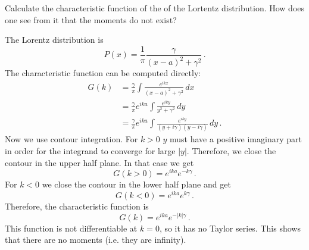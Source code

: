 

Calculate the characteristic function of the of the Lortentz distribution.
How does one see from it that the moments do not exist?


The Lorentz distribution is
\begin{equation*}
  P(x) = \frac{1}{\pi} \frac{\gamma}{(x - a)^2 + \gamma^2}
  \, .
\end{equation*}
The characteristic function can be computed directly:
\begin{align*}
  G(k)
  &= \frac{\gamma}{\pi} \int \frac{e^{i k x}}{(x - a)^2 + \gamma^2} \, dx \\
  &= \frac{\gamma}{\pi} e^{i k a} \int \frac{e^{i k y}}{y^2 + \gamma^2} \, dy \\
  &= \frac{\gamma}{\pi} e^{i k a} \int \frac{e^{i k y}}{(y + i\gamma)(y - i\gamma)} \, dy \, .
\end{align*}
Now we use contour integration.
For $k > 0$ $y$ must have a positive imaginary part in order for the integrand to converge for large $|y|$.
Therefore, we close the contour in the upper half plane.
In that case we get
\begin{equation*}
  G(k > 0) = e^{i k a} e^{-k \gamma} \, .
\end{equation*}
For $k<0$ we close the contour in the lower half plane and get
\begin{equation*}
  G(k < 0) = e^{i k a} e^{k \gamma} \, .
\end{equation*}
Therefore, the characteristic function is
\begin{equation*}
  G(k) = e^{i k a} e^{-|k| \gamma} \, .
\end{equation*}
This function is not differentiable at $k=0$, so it has no Taylor series.
This shows that there are no moments (i.e. they are infinity).
